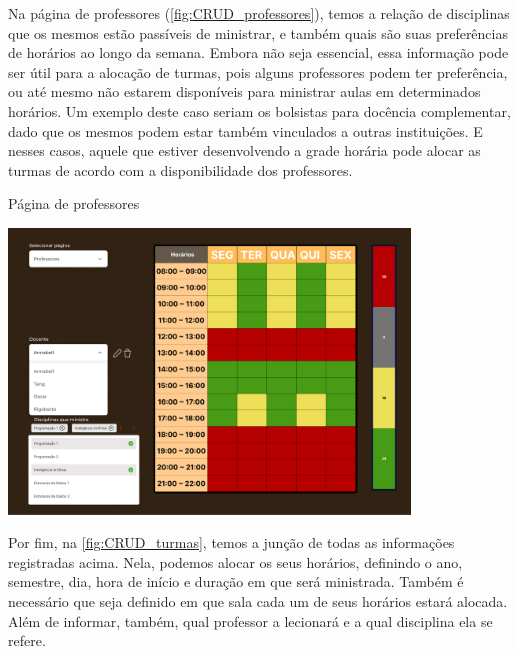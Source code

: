 Na página de professores (\autoref{fig:CRUD_professores}), temos a relação de disciplinas que os mesmos estão passíveis de ministrar, e também quais são suas preferências de horários ao longo da semana. Embora não seja essencial, essa informação pode ser útil para a alocação de turmas, pois alguns professores podem ter preferência, ou até mesmo não estarem disponíveis para ministrar aulas em determinados horários. Um exemplo deste caso seriam os bolsistas para docência complementar, dado que os mesmos podem estar também vinculados a outras instituições. E nesses casos, aquele que estiver desenvolvendo a grade horária pode alocar as turmas de acordo com a disponibilidade dos professores.

\begin{MyCenteredFigure} \caption{Página de professores} \label{fig:CRUD_professores}
  \includegraphics[width=0.8\textwidth]{files/img/2.02!5-desenvolvimento/2.02!5.1.3-prototipagem/2.02!5.1.3.2-paginas/CRUD_professores}
\end{MyCenteredFigure}

Por fim, na \autoref{fig:CRUD_turmas}, temos a junção de todas as informações registradas acima. Nela, podemos alocar os seus horários, definindo o ano, semestre, dia, hora de início e duração em que será ministrada. Também é necessário que seja definido em que sala cada um de seus horários estará alocada. Além de informar, também, qual professor a lecionará e a qual disciplina ela se refere.


